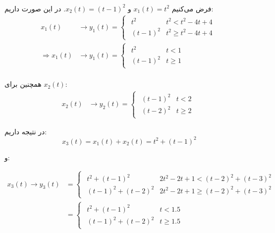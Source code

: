 \documentclass{article}
\begin{document}
	\paragraph*{}
	فرض می‌کنیم
	$x_1(t) = t^2$
	و
	$x_2(t) = (t-1)^2$.
	در این صورت داریم:
	\begin{align*}
		x_1(t) &\rightarrow y_1(t) =
		\begin{cases}
			\begin{matrix}
				t^2 & t^2 < t^2 - 4t + 4 \\
				(t-1)^2 & t^2 \ge t^2 - 4t + 4
			\end{matrix}
		\end{cases} \\
		\Rightarrow
		x_1(t) &\rightarrow y_1(t) =
		\begin{cases}
			\begin{matrix}
				t^2 & t < 1 \\
				(t-1)^2 & t \ge 1
			\end{matrix}
		\end{cases} \\
	\end{align*}

	همچنین برای
	$x_2(t)$:
	\begin{align*}
		x_2(t) &\rightarrow y_2(t) =
		\begin{cases}
			\begin{matrix}
				(t-1)^2 & t < 2 \\
				(t-2)^2 & t \ge 2
			\end{matrix}
		\end{cases}
	\end{align*}

 	در نتیجه داریم:
	\begin{equation*}
		x_3(t) = x_1(t) + x_2(t) = t^2 + (t-1)^2
	\end{equation*}

	و:

	\begin{align*}
		x_3(t) \rightarrow y_3(t) &=
		\begin{cases}
			\begin{matrix}
				t^2 + (t-1)^2 & 2t^2 - 2t + 1 < (t-2)^2 + (t-3)^2 \\
				(t-1)^2 + (t-2)^2 & 2t^2 - 2t + 1 \ge (t-2)^2 + (t-3)^2
			\end{matrix}
		\end{cases} \\
		&=
		\begin{cases}
			\begin{matrix}
				t^2 + (t-1)^2 & t < 1.5 \\
				(t-1)^2 + (t-2)^2 & t \ge 1.5
			\end{matrix}
		\end{cases}
	\end{align*}
\end{document}
